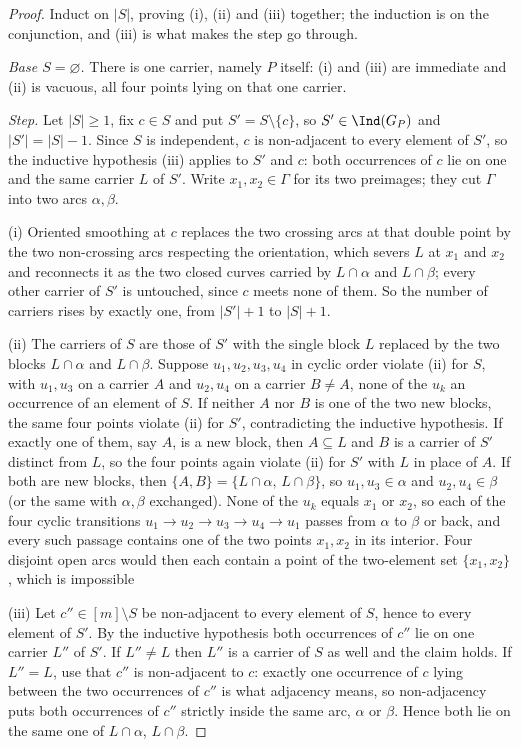 \begin{proof}\leanok{}
Induct on $|S|$, proving (i), (ii) and (iii) together; the induction is on the
conjunction, and (iii) is what makes the step go through.

\emph{Base $S=\varnothing$.} There is one carrier, namely $P$ itself: (i) and
(iii) are immediate and (ii) is vacuous, all four points lying on that one
carrier.

\emph{Step.} Let $|S|\geq1$, fix $c\in S$ and put $S'=S\setminus\{c\}$, so
$S'\in\Ind(G_P)$ and $|S'|=|S|-1$. Since $S$ is independent, $c$ is non-adjacent
to every element of $S'$, so the inductive hypothesis (iii) applies to $S'$ and
$c$: both occurrences of $c$ lie on one and the same carrier $L$ of $S'$. Write $x_1,x_2\in\Gamma$ for its two preimages; they cut $\Gamma$ into two
arcs $\alpha,\beta$.

(i) Oriented smoothing at $c$ replaces the two crossing arcs at that double point
by the two non-crossing arcs respecting the orientation, which severs $L$ at
$x_1$ and $x_2$ and reconnects it as the two closed curves carried by
$L\cap\alpha$ and $L\cap\beta$; every other carrier of $S'$ is untouched, since
$c$ meets none of them. So the number of carriers rises by exactly one, from
$|S'|+1$ to $|S|+1$.

(ii) The carriers of $S$ are those of $S'$ with the single block $L$ replaced by
the two blocks $L\cap\alpha$ and $L\cap\beta$. Suppose $u_1,u_2,u_3,u_4$ in cyclic
order violate (ii) for $S$, with $u_1,u_3$ on a carrier $A$ and $u_2,u_4$ on a
carrier $B\neq A$, none of the $u_k$ an occurrence of an element of $S$. If
neither $A$ nor $B$ is one of the two new blocks, the same four points violate
(ii) for $S'$, contradicting the inductive hypothesis. If exactly one of them, say
$A$, is a new block, then $A\subseteq L$ and $B$ is a carrier of $S'$ distinct
from $L$, so the four points again violate (ii) for $S'$ with $L$ in place of $A$.
If both are new blocks, then $\{A,B\}=\{L\cap\alpha,\,L\cap\beta\}$, so
$u_1,u_3\in\alpha$ and $u_2,u_4\in\beta$ (or the same with $\alpha,\beta$
exchanged). None of the $u_k$ equals $x_1$ or $x_2$, so each of the four cyclic
transitions $u_1\to u_2\to u_3\to u_4\to u_1$ passes from $\alpha$ to $\beta$ or
back, and every such passage contains one of the two points $x_1,x_2$ in its
interior. Four disjoint open arcs would then each contain a point of the
two-element set $\{x_1,x_2\}$, which is impossible

(iii) Let $c''\in[m]\setminus S$ be non-adjacent to every element of $S$, hence to
every element of $S'$. By the inductive hypothesis both occurrences of $c''$ lie
on one carrier $L''$ of $S'$. If $L''\neq L$ then $L''$ is a carrier of $S$ as
well and the claim holds. If $L''=L$, use that $c''$ is non-adjacent to $c$:
exactly one occurrence of $c$ lying between the two occurrences of $c''$ is what
adjacency means, so non-adjacency puts both occurrences of $c''$ strictly inside
the same arc, $\alpha$ or $\beta$. Hence both lie on the same one of
$L\cap\alpha$, $L\cap\beta$.


\end{proof}
